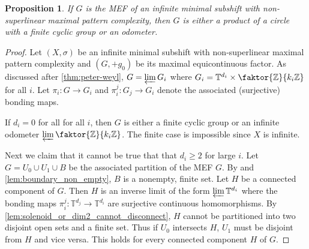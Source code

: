 \documentclass[11pt,reqno]{amsart}
\newtheorem{proposition}[theorem]{Proposition}
\theoremstyle{definition}
\theoremstyle{plain}
\newcommand{\Z}{\mathbb{Z}}
\newcommand{\T}{\mathbb{T}}
\newcommand{\AuthornoteR}[2]{{\sf\small\color{blue}{[#1: #2]}}}
\newcommand{\rp}{\AuthornoteR{R}}
\begin{document}
\begin{proposition}\label{thm:possible_MEF_nonsuperlinear}
If $G$ is the MEF of an infinite minimal subshift with non-superlinear maximal pattern complexity, then $G$ is either a product of a circle with a finite cyclic group or an odometer.
\end{proposition}
\begin{proof}
Let $(X, \sigma)$ be an infinite minimal subshift with non-superlinear maximal pattern complexity and $(G, +g_0)$ be its maximal equicontinuous factor. 
As discussed after \cref{thm:peter-weyl}, $G = \varprojlim G_i$ where $G_i = \T^{d_i} \times \faktor{\Z}{k_i\Z}$ for all $i$.  Let $\pi_i: G \to G_i$ and $\pi_{i}^j: G_j \to G_i$ denote the associated (surjective) bonding maps.


If $d_i = 0$ for all for all $i$, then $G$ is either a finite cyclic group or an infinite odometer $\varprojlim \faktor{\Z}{k_i\Z}$. The finite case is impossible since $X$ is infinite.

Next we claim that it cannot be true that that $d_i \geq 2$ for large $i$. Let $G = U_0 \cup U_1 \cup B$ be the associated partition of the MEF $G$. By  and \cref{lem:boundary_non_empty}, $B$ is a nonempty, finite set. Let $H$ be a connected component of $G$. Then $H$ is an inverse limit of the form $\varprojlim \T^{d_i}$ where the bonding maps $\pi_i^j: \T^{d_j} \to 
\T^{d_i}$ are surjective continuous homomorphisms. By \cref{lem:solenoid_or_dim2_cannot_disconnect}, $H$ cannot be partitioned into two disjoint open sets and a finite set.
Thus if $U_0$ intersects $H$, $U_1$ must be disjoint from $H$ and vice versa. This holds for every connected component $H$ of $G$.


\end{proof}
\end{document}
